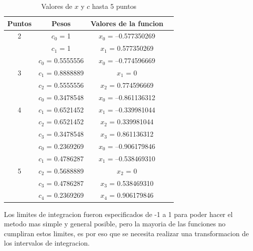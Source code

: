 \documentclass[journal,transmag]{IEEEtran}
\theoremstyle{mytheoremstyle}
\theoremstyle{mytheoremstyle}
\theoremstyle{myproblemstyle}
\begin{document}
                \begin{table}[h]
                    \begin{center}
                        \caption{Valores de $x$ y $c$ hasta 5 puntos}
                        \begin{tabular}{| c | c | c | c |}
                            \hline
                        Puntos & Pesos & Valores de la funcion \\ \hline
                         2& $c_0$ = 1 & $x_0$ = –0.577350269   \\
                         & $c_1$ = 1 &$x_1$ = 0.577350269   \\ \hline
                        & $c_0$ = 0.5555556 & $x_0$ = –0.774596669  \\ 
                         3& $c_1$ = 0.8888889 & $x_1$ = 0  \\ 
                         & $c_2$ = 0.5555556  & $x_2$ = 0.774596669  \\ \hline
                         & $c_0$ = 0.3478548 & $x_0$ = –0.861136312  \\ 
                         4& $c_1$ =  0.6521452 & $x_1$ =  –0.339981044  \\ 
                         & $c_2$ =  0.6521452 & $x_2$ =  0.339981044  \\ 
                         & $c_3$ = 0.3478548  & $x_3$ = 0.861136312 \\ \hline
                         & $c_0$ = 0.2369269 & $x_0$ = –0.906179846   \\ 
                         & $c_1$ = 0.4786287  & $x_1$ = –0.538469310  \\ 
                         5& $c_2$ =  0.5688889 & $x_2$ = 0  \\ 
                         & $c_3$ = 0.4786287 & $x_3$ = 0.538469310  \\ 
                         & $c_4$ = 0.2369269  & $x_4$ = 0.906179846 \\ \hline
                         
                        \end{tabular}
                        \label{tab:ejemploTablaGauss}
                    \end{center}
                        \end{table}
             
             Los limites de integracion fueron especificados de -1 a 1 para poder hacer el metodo mas simple y general posible, pero la mayoria de las funciones no cumpliran estos limites, es por eso que se necesita realizar una transformacion de los intervalos de integracion.
            
\end{document}
